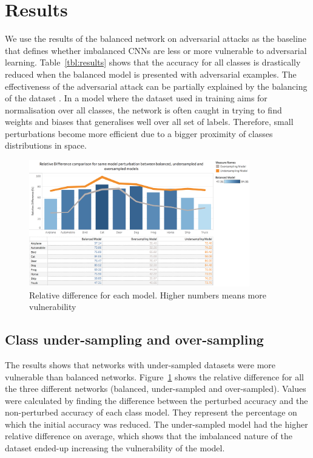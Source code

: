 \documentclass[runningheads,a4paper]{llncs}
\begin{document}
\section{Results}
We use the results of the balanced network on adversarial attacks as the baseline that defines whether imbalanced CNNs are less or more vulnerable to adversarial learning. Table~\ref{tbl:results} shows that the accuracy for all classes is drastically reduced when the balanced model is presented with adversarial examples. The effectiveness of the adversarial attack can be partially explained by the balancing of the dataset . In a model where the dataset used in training aims for normalisation over all classes, the network is often caught in trying to find weights and biases that generalises well over all set of labels. Therefore, small perturbations become more efficient due to a bigger proximity of classes distributions in space.

\begin{figure}
	\centering
	\includegraphics[height=5.5cm]{rel_diff_graph.png}
	\caption{Relative difference for each model. Higher numbers means more vulnerability}
	\label{fig:relative_difference}
\end{figure}
\subsection{Class under-sampling and over-sampling}

The results shows that networks with under-sampled datasets were more vulnerable than balanced networks. Figure~\ref{fig:relative_difference} shows the relative difference for all the three different networks (balanced, under-sampled and over-sampled). Values were calculated by finding the difference between the perturbed accuracy and the non-perturbed accuracy of each class model. They represent the percentage on which the initial accuracy was reduced. The under-sampled model had the higher relative difference on average, which shows that the imbalanced nature of the dataset ended-up increasing the vulnerability of the model.
\end{document}
